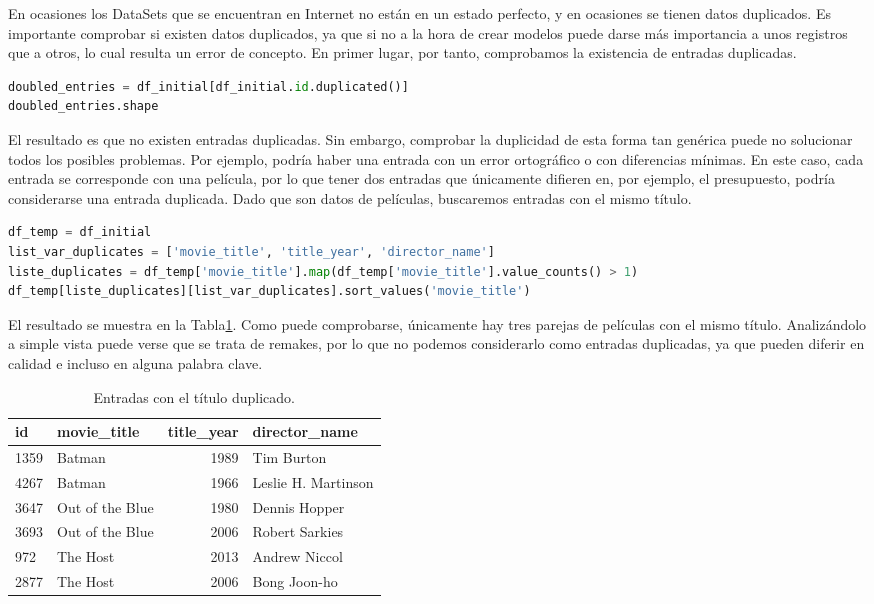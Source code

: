 En ocasiones los DataSets que se encuentran en Internet no están en un estado perfecto, y en ocasiones se tienen datos duplicados. Es importante comprobar si existen datos duplicados, ya que si no a la hora de crear modelos puede darse más importancia a unos registros que a otros, lo cual resulta un error de concepto. En primer lugar, por tanto, comprobamos la existencia de entradas duplicadas.
\begin{lstlisting}[language=Python, caption=Entradas duplicadas]
doubled_entries = df_initial[df_initial.id.duplicated()]
doubled_entries.shape
\end{lstlisting}
El resultado es que no existen entradas duplicadas. Sin embargo, comprobar la duplicidad de esta forma tan genérica puede no solucionar todos los posibles problemas. Por ejemplo, podría haber una entrada con un error ortográfico o con diferencias mínimas. En este caso, cada entrada se corresponde con una película, por lo que tener dos entradas que únicamente difieren en, por ejemplo, el presupuesto, podría considerarse una entrada duplicada. Dado que son datos de películas, buscaremos entradas con el mismo título. 

\begin{lstlisting}[language=Python, caption=Entradas con título duplicado.]
df_temp = df_initial
list_var_duplicates = ['movie_title', 'title_year', 'director_name']
liste_duplicates = df_temp['movie_title'].map(df_temp['movie_title'].value_counts() > 1)
df_temp[liste_duplicates][list_var_duplicates].sort_values('movie_title')
\end{lstlisting}

El resultado se muestra en la Tabla\ref{tab:duplicated_entries}. Como puede comprobarse, únicamente hay tres parejas de películas con el mismo título. Analizándolo a simple vista puede verse que se trata de remakes, por lo que no podemos considerarlo como entradas duplicadas, ya que pueden diferir en calidad e incluso en alguna palabra clave.
\begin{table}[h]
\centering
\begin{tabular}{llrl}
\toprule
\textbf{id} &     \textbf{movie\_title} &  \textbf{title\_year} &        \textbf{director\_name} \\
\midrule
1359 &           Batman &      1989 &           Tim Burton \\
4267 &           Batman &      1966 &  Leslie H. Martinson \\
3647 &  Out of the Blue &      1980 &        Dennis Hopper \\
3693 &  Out of the Blue &      2006 &       Robert Sarkies \\
972  &         The Host &      2013 &        Andrew Niccol \\
2877 &         The Host &      2006 &         Bong Joon-ho \\
\bottomrule
\end{tabular}
\caption{Entradas con el título duplicado.}
\label{tab:duplicated_entries}
\end{table}

